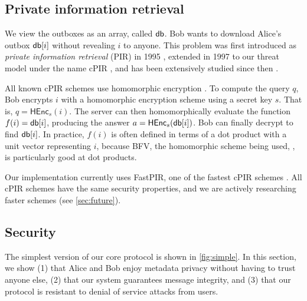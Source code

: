 \subsection{Private information retrieval}

We view the outboxes as an array, called $\mathsf{db}$. Bob wants to download Alice's outbox $\mathsf{db}[i]$ without revealing $i$ to anyone. This problem was first introduced as \textit{private information retrieval} (PIR) in 1995 \cite{chor1995private}, extended in 1997 to our threat model under the name cPIR \cite{kushilevitz1997replication}, and has been extensively studied since then \cite{melchor2016xpir,angel2018pir, ahmad2021addra}.

All known cPIR schemes use homomorphic encryption \cite{gentry2010computing}. To compute the query $q$, Bob encrypts $i$ with a homomorphic encryption scheme using a secret key $s$. That is, $q = \mathsf{HEnc}_s(i)$. The server can then homomorphically evaluate the function $f(i) = \mathsf{db}[i]$, producing the answer $a = \mathsf{HEnc}_s(\mathsf{db}[i])$. Bob can finally decrypt to find $\mathsf{db}[i]$. In practice, $f(i)$ is often defined in terms of a dot product with a unit vector representing $i$, because BFV, the homomorphic scheme being used, \cite{fan2012somewhat}, is particularly good at dot products.

Our implementation currently uses FastPIR, one of the fastest cPIR schemes \cite{ahmad2021addra}. All cPIR schemes have the same security properties, and we are actively researching faster schemes (see \cref{sec:future}).

\subsection{Security}

The simplest version of our core protocol is shown in \cref{fig:simple}. In this section, we show (1) that Alice and Bob enjoy metadata privacy without having to trust anyone else, (2) that our system guarantees message integrity, and (3) that our protocol is resistant to denial of service attacks from users.




